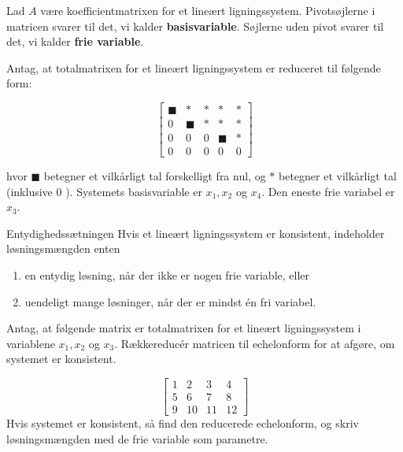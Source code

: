 Lad $A$ være koefficientmatrixen for et lineært ligningssystem. Pivotsøjlerne i matricen svarer til det, vi kalder \textbf{basisvariable}. Søjlerne uden pivot svarer til det, vi kalder \textbf{frie variable}.

\begin{example} Antag, at totalmatrixen for et lineært ligningssystem er reduceret til følgende form:

\[
\left[\begin{array}{lllll}
\blacksquare & * & * & * & * \\
0 & \blacksquare & * & * & * \\
0 & 0 & 0 & \blacksquare & * \\
0 & 0 & 0 & 0 & 0
\end{array}\right]
\]

hvor $\blacksquare$ betegner et vilkårligt tal forskelligt fra nul, og $*$ betegner et vilkårligt tal (inklusive 0 ). Systemets basisvariable er $x_1, x_2$ og $x_4$. Den eneste frie variabel er $x_3$.

\end{example}


\begin{theorem}{Entydighedssætningen}
    Hvis et lineært ligningssystem er konsistent, indeholder løsningsmængden enten
    \begin{enumerate}[label=(\roman*)]
        \item en entydig løsning, når der ikke er nogen frie variable, eller
        \item uendeligt mange løsninger, når der er mindst én fri variabel.
    \end{enumerate}
\end{theorem}

\begin{example} Antag, at følgende matrix er totalmatrixen for et lineært ligningssystem i variablene $x_1, x_2$ og $x_3$. Rækkereducér matricen til echelonform for at afgøre, om systemet er konsistent.

\[
\left[\begin{array}{cccc}
1 & 2 & 3 & 4 \\
5 & 6 & 7 & 8 \\
9 & 10 & 11 & 12
\end{array}\right]
\]
Hvis systemet er konsistent, så find den reducerede echelonform, og skriv løsningsmængden med de frie variable som parametre.
\end{example}


